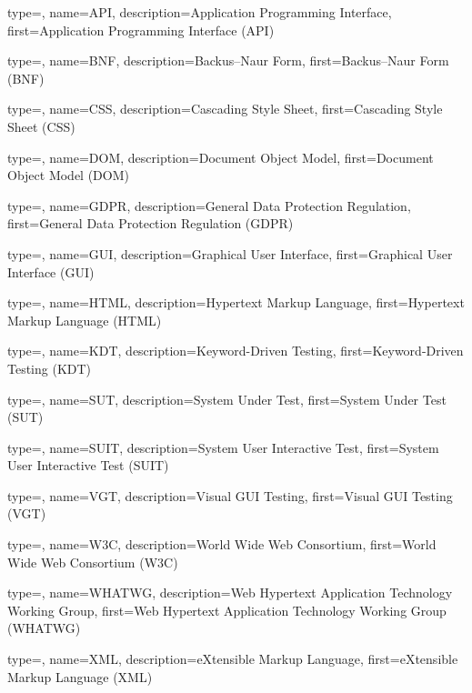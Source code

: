 
{
	type=\acronymtype,
	name={API},
	description={Application Programming Interface},
	first={Application Programming Interface (API)}
}

{
	type=\acronymtype,
	name={BNF},
	description={Backus–Naur Form},
	first={Backus–Naur Form (BNF)}
}

{
	type=\acronymtype,
	name={CSS},
	description={Cascading Style Sheet},
	first={Cascading Style Sheet (CSS)}
}


{
	type=\acronymtype,
	name={DOM},
	description={Document Object Model},
	first={Document Object Model (DOM)}
}

{
	type=\acronymtype,
	name={GDPR},
	description={General Data Protection Regulation},
	first={General Data Protection Regulation (GDPR)}
}

{
	type=\acronymtype,
	name={GUI},
	description={Graphical User Interface},
	first={Graphical User Interface (GUI)}
}



{
	type=\acronymtype,
	name={HTML},
	description={Hypertext Markup Language},
	first={Hypertext Markup Language (HTML)}
}


{
	type=\acronymtype,
	name={KDT},
	description={Keyword-Driven Testing},
	first={Keyword-Driven Testing (KDT)}
}

{
	type=\acronymtype,
	name={SUT},
	description={System Under Test},
	first={System Under Test (SUT)}
}

{
	type=\acronymtype,
	name={SUIT},
	description={System User Interactive Test},
	first={System User Interactive Test (SUIT)}
}

{
	type=\acronymtype,
	name={VGT},
	description={Visual GUI Testing},
	first={Visual GUI Testing (VGT)}
}



{
	type=\acronymtype,
	name={W3C},
	description={World Wide Web Consortium},
	first={World Wide Web Consortium (W3C)}
}

{
	type=\acronymtype,
	name={WHATWG},
	description={Web Hypertext Application Technology Working Group},
	first={Web Hypertext Application Technology Working Group (WHATWG)}
}



{
	type=\acronymtype,
	name={XML},
	description={eXtensible Markup Language},
	first={eXtensible Markup Language (XML)}
}